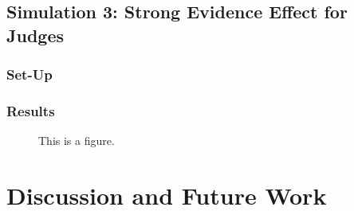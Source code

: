 \documentclass[10pt,letterpaper]{article}
\begin{document}
\subsection{Simulation 3: Strong Evidence Effect for Judges}
\subsubsection{Set-Up}
\subsubsection{Results}

\begin{figure}[H]
\begin{center}
\end{center}
\caption{This is a figure.} 
\label{seeJudge}
\end{figure}

\section{Discussion and Future Work}
\end{document}
